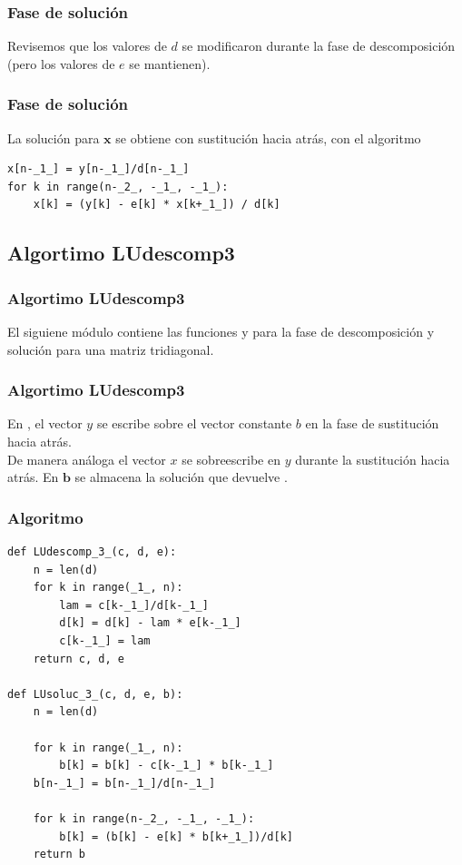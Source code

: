 \begin{frame}[fragile]
\frametitle{Fase de solución}
Revisemos que los valores de $d$ se modificaron durante la fase de descomposición (pero los valores de $e$ se mantienen).
\end{frame}
\begin{frame}[fragile]
\frametitle{Fase de solución}
La solución para $\mathbf{x}$ se obtiene con sustitución hacia atrás, con el algoritmo
\begin{lstlisting}[caption=Sustitución hacia atrás, style=FormattedNumber, basicstyle=\linespread{1.1}\ttfamily=\small, columns=fullflexible]
x[n-_1_] = y[n-_1_]/d[n-_1_]
for k in range(n-_2_, -_1_, -_1_):
    x[k] = (y[k] - e[k] * x[k+_1_]) / d[k]
\end{lstlisting}
\end{frame}
\subsection{Algortimo LUdescomp3}
\begin{frame}
\frametitle{Algortimo LUdescomp3}
El siguiene módulo contiene las funciones  y  para la fase de descomposición y solución para una matriz tridiagonal.
\end{frame}
\begin{frame}
\frametitle{Algortimo LUdescomp3}
En , el vector $y$ se escribe sobre el vector constante $b$ en la fase de sustitución hacia atrás.
\\
\bigskip
De manera análoga el vector $x$ se sobreescribe en $y$ durante la sustitución hacia atrás. En $\mathbf{b}$ se almacena la solución que devuelve .
\end{frame}
\begin{frame}
\frametitle{Algoritmo}
\begin{lstlisting}[caption=Algoritmo para la solución tridiagonal, style=FormattedNumber, basicstyle=\linespread{1.1}\ttfamily=\small, columns=fullflexible]
def LUdescomp_3_(c, d, e):
    n = len(d)
    for k in range(_1_, n):
        lam = c[k-_1_]/d[k-_1_]
        d[k] = d[k] - lam * e[k-_1_]
        c[k-_1_] = lam
    return c, d, e
    
def LUsoluc_3_(c, d, e, b):
    n = len(d)

    for k in range(_1_, n):
        b[k] = b[k] - c[k-_1_] * b[k-_1_]
    b[n-_1_] = b[n-_1_]/d[n-_1_]

    for k in range(n-_2_, -_1_, -_1_):
        b[k] = (b[k] - e[k] * b[k+_1_])/d[k]
    return b
\end{lstlisting}
\end{frame}
